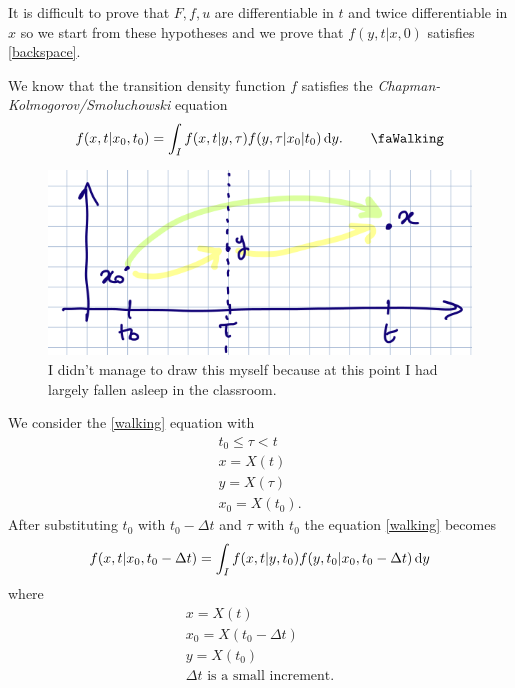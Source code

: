 \documentclass[12pt]{report}
\begin{document}
\begin{fancyproof}
	It is difficult to prove that $F,f,u$ are differentiable in $t$ and twice differentiable in $x$ so we start from these hypotheses and we prove that $f(y,t|x,0)$ satisfies \ref{backspace}.\par
	We know that the transition density function $f$ satisfies the \emph{Chapman-Kolmogorov/Smoluchowski} equation
	\begin{equation*}
		f(x,t|x_{0},t_{0})=\int_{I}f(x,t|y,\tau)f(y,\tau|x_{0}|t_{0})\dy.\tag*{\faWalking}\label{walking}
	\end{equation*}
	\begin{figure}[H]
		\centering
		\includegraphics[width=0.7\linewidth]{img/screenshot051}
		\caption{I didn't manage to draw this myself because at this point I had largely fallen asleep in the classroom.}
		\label{fig:screenshot051}
	\end{figure}
	We consider the \ref{walking} equation with
	\begin{equation*}
		\begin{array}{c}
			t_{0}\leq\tau<t\\
			x=X(t)\\
			y=X(\tau)\\
			x_{0}=X(t_{0}).
		\end{array}
	\end{equation*}
	After substituting $t_{0}$ with $t_{0}-\Delta t$ and $\tau$ with $t_{0}$ the equation \ref{walking} becomes
	\begin{equation*}
		f(x,t|x_{0},t_{0}-\Delta t)=\int_{I}f(x,t|y,t_{0})f(y,t_{0}|x_{0},t_{0}-\Delta t)\mathop{}\!\mathrm{d} y
	\end{equation*}
	where 
	\begin{equation*}
		\begin{array}{l}
			x=X(t)\\
			x_{0}=X(t_{0}-\Delta t)\\
			y=X(t_{0})\\
			\Delta t\text{ is a small increment}.
		\end{array}
	\end{equation*}

\end{fancyproof}
\end{document}
